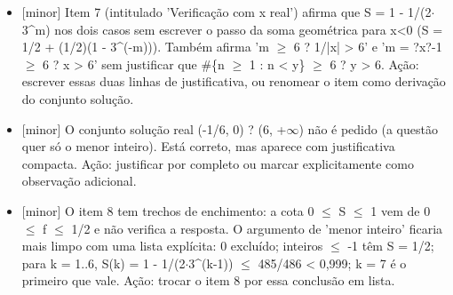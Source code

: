 \documentclass{article}%
\begin{document}
\begin{itemize}%
\item%
{[}minor{]} Item 7 (intitulado 'Verificação com x real') afirma que S = 1 - 1/(2$\cdot$3\^{}m) nos dois casos sem escrever o passo da soma geométrica para x<0 (S = 1/2 + (1/2)(1 - 3\^{}(-m))). Também afirma 'm $\geq$ 6 ? 1/|x| > 6' e 'm = ?x?-1 $\geq$ 6 ? x > 6' sem justificar que \#\{n $\geq$ 1 : n < y\} $\geq$ 6 ? y > 6. Ação: escrever essas duas linhas de justificativa, ou renomear o item como derivação do conjunto solução.%
\item%
{[}minor{]} O conjunto solução real (-1/6, 0) ? (6, +$\infty$) não é pedido (a questão quer só o menor inteiro). Está correto, mas aparece com justificativa compacta. Ação: justificar por completo ou marcar explicitamente como observação adicional.%
\item%
{[}minor{]} O item 8 tem trechos de enchimento: a cota 0 $\leq$ S $\leq$ 1 vem de 0 $\leq$ f $\leq$ 1/2 e não verifica a resposta. O argumento de 'menor inteiro' ficaria mais limpo com uma lista explícita: 0 excluído; inteiros $\leq$ -1 têm S = 1/2; para k = 1..6, S(k) = 1 - 1/(2$\cdot$3\^{}(k-1)) $\leq$ 485/486 < 0,999; k = 7 é o primeiro que vale. Ação: trocar o item 8 por essa conclusão em lista.%
\end{itemize}%
\end{document}
